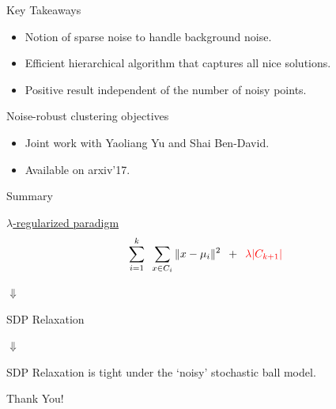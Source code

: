 \documentclass{beamer}
\begin{document}
\begin{frame}{Key Takeaways}
	\begin{itemize}
		\item Notion of sparse noise to handle background noise.
		\vspace{25pt}\item Efficient hierarchical algorithm that captures {\color{blue}all nice} solutions.
		\vspace{25pt}\item Positive result {\color{blue}independent} of the number of noisy points.
	\end{itemize}
\end{frame}

\begin{frame}{Noise-robust clustering objectives}
	\begin{itemize}
		\item Joint work with Yaoliang Yu and Shai Ben-David.
		\vspace{25pt}\item Available on \alert{arxiv'17}. 
	\end{itemize}
\end{frame}

\begin{frame}[label=optimizationNoise]{Summary}
	\begin{block}{\hyperlink{detailsOptimizationNoise}{$\lambda$-regularized paradigm}}
		$$\sum_{i =1}^k\enspace\sum_{x \in C_i} \|x - \mu_i\|^2 \enspace+\enspace \textcolor{red}{\lambda |C_{k+1}|}$$
	\end{block}
	
	\begin{center}$\Downarrow$\end{center}
	
	\begin{block}{}
		\begin{center}SDP Relaxation\end{center}
	\end{block}
	
	\begin{center}$\Downarrow$\end{center}
	
	\begin{block}{}
		SDP Relaxation is tight under the \alert{`noisy' stochastic ball} model.
	\end{block}
		
\end{frame}

\begin{frame}
    \Huge{\centerline{Thank You!}}
\end{frame}
\end{document}
